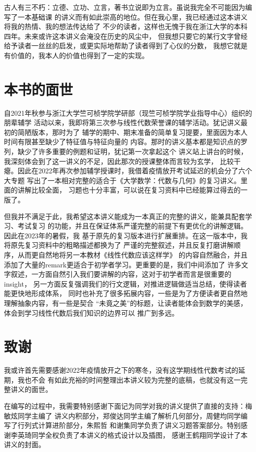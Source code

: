 古人有三不朽：立德、立功、立言，著书立说即为立言。虽说我完全不可能因为编写了一本基础课
的讲义而有如此崇高的地位。但在我心里，我已经通过这本讲义将我的热情、我的想法传达给了
不少的读者，这样也无愧于我在浙江大学的本科四年。未来或许这本讲义会淹没在历史的风尘中，
但我想只要它的某行文字曾经给予读者一丝丝的启发，或更实际地帮助了读者得到了心仪的分数，
我想它就是有价值的，我本人的价值也得到了一定的实现。

\section*{本书的面世}
自2021年秋参与浙江大学竺可桢学院学研部（现竺可桢学院学业指导中心）组织的朋辈辅学
活动以来，我即将第三次参与线性代数荣誉课的辅学活动。犹记讲义最初的简陋版本，那时为了
辅学的期中、期末准备的简单复习提要，里面因为本人时间有限甚至缺少了特征值与特征向量的
内容。那时的讲义基本都是知识点的罗列，缺少了许多重要的例题和证明，犹记第一次拿起这个
讲义站上讲台的时候，我深刻体会到了这一讲义的不足，因此那次的授课整体而言较为玄学，
比较干瘪。因此在2022年再次参加辅学授课时，我借着疫情放开考试延迟的机会分了六个大专题
写出了一本相对完整的适合于《大学数学：代数与几何》的复习讲义。里面的讲解比较全面，
习题也十分丰富，可以说在复习资料中已经能算过得去的一版了。

但我并不满足于此，我希望这本讲义能成为一本真正的完整的讲义，能兼具配套学习、考试复习
的功能，并且在保证体系严谨完整的前提下有更优化的讲解逻辑。因此在2023年的暑假，我
基于原先的复习版本进行扩展重排。在这一版本中，我将原先复习资料中的粗略描述都换为了
严谨的完整叙述，并且反复打磨讲解顺序，从而更自然地将另一本教材《线性代数应该这样学》
的内容自然融合，并且添加了大量的remark更适合于初学者学习。更重要的是，我们中间添加了
许多文字叙述，一方面自然引入我们要讲解的内容，这对于初学者而言是很重要的insight，
另一方面反复强调我们的行文逻辑，对推进逻辑做适当总结，使得读者能更快地形成体系，
同时也补充了很多拓展内容，一些是为了方便读者更自然地理解抽象内容，有一些是契合
``未竟之美''的标题，让读者能体会到数学的美感，体会到学习线性代数后我们知识的边界可以
推广到多远。

\section*{致谢}
我或许首先需要感谢2022年疫情放开之下的寒冬，没有这学期线性代数考试的延期，我也不会
有如此充裕的时间整理出本讲义较为完整的底稿，也就没有这一完整讲义的面世。

在编写的过程中，我需要特别感谢下面记为同学对我的讲义提供了直接的支持：梅敏炫同学主编了
讲义内积部分，郑俊达同学主编了解析几何部分，周健均同学编写了行列式计算进阶部分，朱熙哲
和谢集同学负责了讲义习题答案部分。特别感谢李英琦同学全权负责了本讲义的格式设计以及插图，
感谢王鹤翔同学设计了本讲义的封面。

